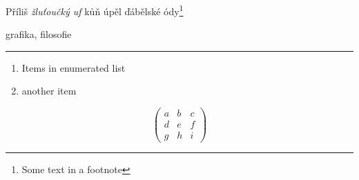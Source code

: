 \documentclass{article}
\begin{document}
Příliš \textit{žluťoučký uf} kůň úpěl ďábělské ódy\footnote{Some text in a footnote}

grafika, filosofie

\hrule

\begin{enumerate}
\item Items in enumerated list
\item another item
\end{enumerate}
\[ \left( \begin{array}{ccc}
a & b & c \\
d & e & f \\
g & h & i \end{array} \right)\] 
\end{document}
